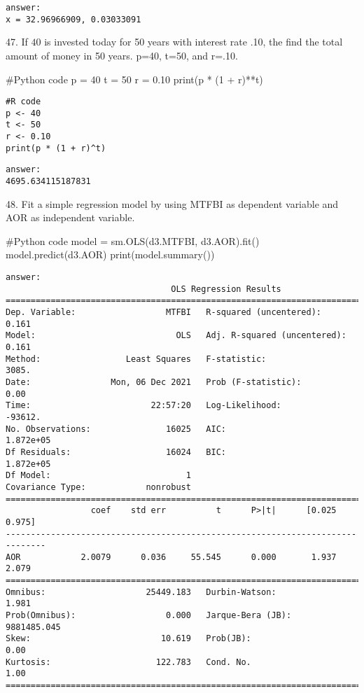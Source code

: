 \documentclass{article}
\begin{document}
\begin{verbatim}
answer: 
x = 32.96966909, 0.03033091
\end{verbatim}

47.	If $40$ is invested today for 50 years with interest rate .10, the find the total amount of money in 50 years. p=40, t=50, and r=.10.
\begin{pythoncode}
#Python code
p = 40
t = 50
r = 0.10
print(p * (1 + r)**t)
\end{pythoncode}

\begin{verbatim}
#R code
p <- 40
t <- 50
r <- 0.10
print(p * (1 + r)^t)
\end{verbatim}

\begin{verbatim}
answer: 
4695.634115187831
\end{verbatim}


48.	Fit a simple regression model by using MTFBI as dependent variable and AOR as independent variable.
\begin{pythoncode}
#Python code
model = sm.OLS(d3.MTFBI, d3.AOR).fit()
model.predict(d3.AOR)
print(model.summary())
\end{pythoncode}

\begin{verbatim}
answer: 
                                 OLS Regression Results
=======================================================================================
Dep. Variable:                  MTFBI   R-squared (uncentered):                   0.161
Model:                            OLS   Adj. R-squared (uncentered):              0.161
Method:                 Least Squares   F-statistic:                              3085.
Date:                Mon, 06 Dec 2021   Prob (F-statistic):                        0.00
Time:                        22:57:20   Log-Likelihood:                         -93612.
No. Observations:               16025   AIC:                                  1.872e+05
Df Residuals:                   16024   BIC:                                  1.872e+05
Df Model:                           1
Covariance Type:            nonrobust
==============================================================================
                 coef    std err          t      P>|t|      [0.025      0.975]
------------------------------------------------------------------------------
AOR            2.0079      0.036     55.545      0.000       1.937       2.079
==============================================================================
Omnibus:                    25449.183   Durbin-Watson:                   1.981
Prob(Omnibus):                  0.000   Jarque-Bera (JB):          9881485.045
Skew:                          10.619   Prob(JB):                         0.00
Kurtosis:                     122.783   Cond. No.                         1.00
==============================================================================
\end{verbatim}
\end{document}
